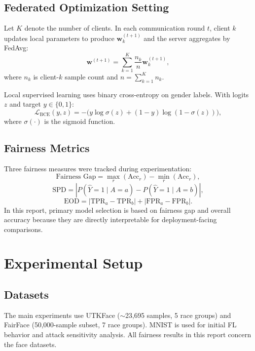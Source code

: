 \documentclass[11pt,a4paper]{article}
\begin{document}
\subsection{Federated Optimization Setting}
Let $K$ denote the number of clients. In each communication round $t$, client $k$ updates local parameters to produce $\mathbf{w}_k^{(t+1)}$ and the server aggregates by FedAvg:
\begin{equation}
\mathbf{w}^{(t+1)} = \sum_{k=1}^{K} \frac{n_k}{n} \mathbf{w}_k^{(t+1)},
\end{equation}
where $n_k$ is client-$k$ sample count and $n = \sum_{k=1}^{K} n_k$.

Local supervised learning uses binary cross-entropy on gender labels. With logits $z$ and target $y \in \{0,1\}$:
\begin{equation}
\mathcal{L}_{\mathrm{BCE}}(y,z) = -\big(y\log \sigma(z) + (1-y)\log(1-\sigma(z))\big),
\end{equation}
where $\sigma(\cdot)$ is the sigmoid function.

\subsection{Fairness Metrics}
Three fairness measures were tracked during experimentation:
\begin{equation}
\text{Fairness Gap} = \max_r(\mathrm{Acc}_r) - \min_r(\mathrm{Acc}_r),
\end{equation}
\begin{equation}
\text{SPD} = \left|P(\hat{Y}=1\mid A=a) - P(\hat{Y}=1\mid A=b)\right|,
\end{equation}
\begin{equation}
\text{EOD} = \left|\mathrm{TPR}_a-\mathrm{TPR}_b\right| + \left|\mathrm{FPR}_a-\mathrm{FPR}_b\right|.
\end{equation}
In this report, primary model selection is based on fairness gap and overall accuracy because they are directly interpretable for deployment-facing comparisons.

\section{Experimental Setup}
\subsection{Datasets}
The main experiments use UTKFace ($\sim$23,695 samples, 5 race groups) and FairFace (50,000-sample subset, 7 race groups). MNIST is used for initial FL behavior and attack sensitivity analysis. All fairness results in this report concern the face datasets.
\end{document}
